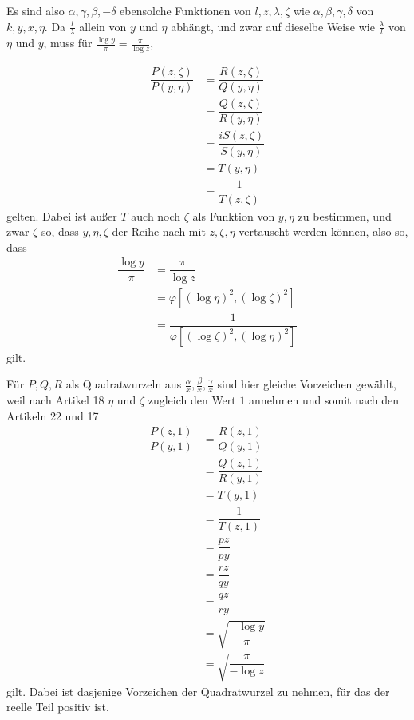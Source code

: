 Es sind also $\alpha,\allowbreak \gamma,\allowbreak \beta,\allowbreak -\delta$ ebensolche Funktionen von $l,\allowbreak z,\allowbreak \lambda,\allowbreak \zeta$ wie $\alpha,\allowbreak \beta,\allowbreak \gamma,\allowbreak \delta$ von $k,\allowbreak y,\allowbreak x,\allowbreak \eta$. Da $\frac{l}{\lambda}$ allein von $y$ und $\eta$ abhängt, und zwar auf dieselbe Weise wie $\frac{\lambda}{l}$ von $\eta$ und $y$, muss für $\frac{\log y}{\pi}=\frac{\pi}{\log z}$,


\[
\begin{aligned}\dfrac{P(z,\zeta)}{P(y,\eta)}&=\dfrac{R(z,\zeta)}{Q(y,\eta)}\\[7pt]&=\dfrac{Q(z,\zeta)}{R(y,\eta)}\\[7pt]&=\dfrac{iS(z,\zeta)}{S(y,\eta)}\\[7pt]&=T(y,\eta)\\[7pt]&=\dfrac{1}{T(z,\zeta)}\end{aligned}
\]
gelten. Dabei ist außer $T$ auch noch $\zeta$ als Funktion von $y,\allowbreak \eta$ zu bestimmen, und zwar $\zeta$ so, dass $y,\allowbreak \eta,\allowbreak \zeta$ der Reihe nach mit $z,\allowbreak \zeta,\allowbreak \eta$ vertauscht werden können, also so, dass
\[
\begin{aligned}\dfrac{\log y}{\pi}&=\dfrac{\pi}{\log z}\\[7pt]&=\varphi[(\log\eta)^2,(\log\zeta)^2]\\[7pt]&=\dfrac{1}{\varphi[(\log\zeta)^2,(\log\eta)^2]}\end{aligned}
\]
gilt.

Für $P,\allowbreak Q,\allowbreak R$ als Quadratwurzeln aus $\frac{\alpha}{x},\allowbreak \frac{\beta}{x},\allowbreak \frac{\gamma}{x}$ sind hier gleiche Vorzeichen gewählt, weil nach Artikel 18 $\eta$ und $\zeta$ zugleich den Wert $1$ annehmen und somit nach den Artikeln 22 und 17
\[
\begin{aligned}\dfrac{P(z,1)}{P(y,1)}&=\dfrac{R(z,1)}{Q(y,1)}\\[7pt]&=\dfrac{Q(z,1)}{R(y,1)}\\[7pt]&=T(y,1)\\[7pt]&=\dfrac{1}{T(z,1)}\\[7pt]&=\dfrac{pz}{py}\\[7pt]&=\dfrac{rz}{qy}\\[7pt]&=\dfrac{qz}{ry}\\[7pt]&=\surd {\dfrac{-\log y}{\pi}}\\[7pt]&=\surd {\dfrac{\pi}{-\log z}}\end{aligned}
\]
gilt. Dabei ist dasjenige Vorzeichen der Quadratwurzel zu nehmen, für das der reelle Teil positiv ist.

